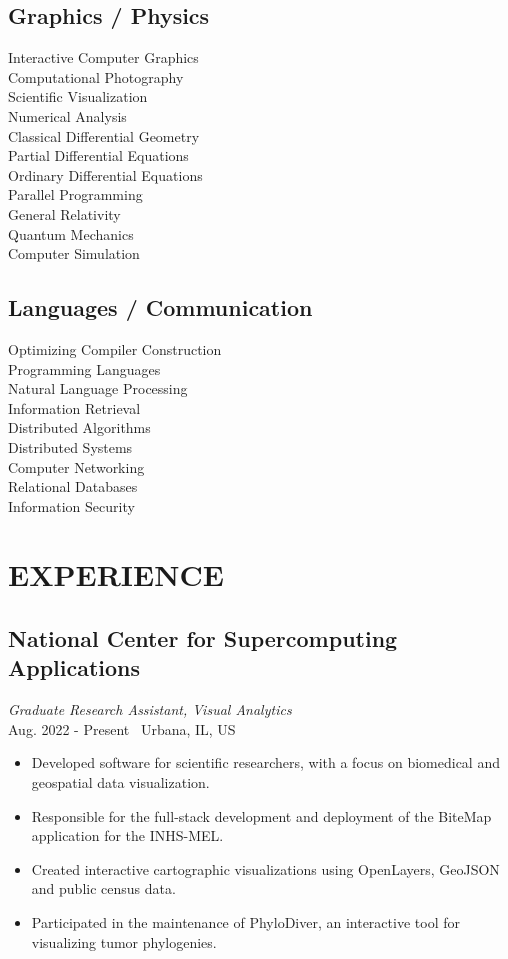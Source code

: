 \documentclass[11pt,twocolumn]{article}
\begin{document}
\subsection*{{Graphics / Physics}}
Interactive Computer Graphics\\
Computational Photography\\
Scientific Visualization\\
Numerical Analysis\\
Classical Differential Geometry\\
Partial Differential Equations\\
Ordinary Differential Equations\\
Parallel Programming\\
General Relativity\\
Quantum Mechanics\\
Computer Simulation

\subsection*{{Languages / Communication}}
Optimizing Compiler Construction\\
Programming Languages\\
Natural Language Processing\\
Information Retrieval\\
Distributed Algorithms\\
Distributed Systems\\
Computer Networking\\
Relational Databases\\
Information Security\\

\newpage

\section*{\textnormal{EXPERIENCE}}

\subsection*{National Center for Supercomputing Applications}
\textit{Graduate Research Assistant, Visual Analytics} \\
Aug. 2022 - Present \textbullet\ Urbana, IL, US

\begin{itemize}
\item Developed software for scientific researchers, with a focus on biomedical and geospatial data visualization.
\item Responsible for the full-stack development and deployment of the BiteMap application for the INHS-MEL.
\item Created interactive cartographic visualizations using OpenLayers, GeoJSON and public census data.
\item Participated in the maintenance of PhyloDiver, an interactive tool for visualizing tumor phylogenies.
\end{itemize}
\end{document}
